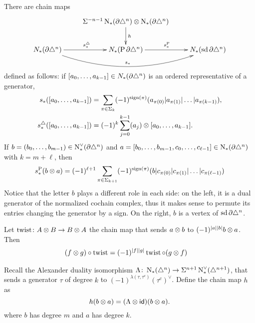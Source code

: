 There are chain maps
\[
\xymatrix{
	&\susp{-n-1}\chains(\partial\simplex^n) \ot  \chains(\partial\simplex^n)\ar[d]^h& \\
	\cadenas(\partial\simplex^n)\ar[r]^{s_*^{\simplex}}\ar@/_2.0pc/[rr]^{s_*} & \cadenas(\Psd \partial\simplex^n)\ar[r]^{s^{\Psd}_*} & \cadenas(\sd\partial\simplex^n)
}
\]
defined as follows: if $[a_0,\ldots,a_{k-1}]\in N_{*}(\partial\triangle^n)$ is an ordered representative of a generator,
\begin{align*}
	s_*([a_0,\ldots,a_{k-1}]) &= \sum_{\pi\in \Sigma_{k}} (-1)^{\operatorname{sign}(\pi)}(a_{\pi(0)}|a_{\pi(1)}|\ldots|a_{\pi(k-1)}),
	\\
	s_*^{\triangle}([a_0,\ldots,a_{k-1}]) &= (-1)^{k}\sum_{j=0}^{k-1} (a_j) \otimes  [a_0,\ldots,a_{k-1}].
\end{align*}
If $b = (b_0,\ldots,b_{m-1})\in \operatorname{N}^\vee_{*}(\partial\triangle^n)$ and $a = [b_0,\ldots,b_{m-1},c_0,\ldots,c_{\ell-1}]\in \operatorname{N}_{*}(\partial\triangle^n)$ with $k = m+\ell$, then
\begin{equation}\label{eq:sP}
	s_*^{\operatorname{P}}(b \otimes  a) = (-1)^{\ell+1}\sum_{\pi\in \Sigma_{k+1}} (-1)^{\operatorname{sign}(\pi)} (b|c_{\pi(0)}|c_{\pi(1)}|\ldots|c_{\pi(\ell-1)})
\end{equation}
Notice that the letter $b$ plays a different role in each side: on the left, it is a dual generator of the normalized cochain complex, thus it makes sense to permute its entries changing the generator by a sign. On the right, $b$ is a vertex of $\operatorname{sd}\partial\triangle^n$.

\begin{remark}
	Let $\operatorname{twist} \colon  A \otimes  B\to B \otimes  A$ the chain map that sends $a \otimes  b$ to $(-1)^{|a||b|}b \otimes  a$. Then
	\begin{align*}
		(f \otimes  g)\circ \operatorname{twist} &= (-1)^{|f||g|}\operatorname{twist} \circ (g \otimes  f)
	\end{align*}
\end{remark}

Recall the Alexander duality isomorphism $\Lambda \colon  \operatorname{N}_{*}(\triangle^n) \to \Sigma^{n+1}\operatorname{N}^\vee_{*}(\triangle^{n+1})$, that sends a generator $\tau$ of degree $k$ to $(-1)^{\lambda(\tau,\tau^c)} (\tau^c)^{\vee}$. Define the chain map $h$ as
\[
h( b \otimes  a) = (\Lambda \otimes  \mathsf{id})(b \otimes  a).
\]
where $b$ has degree $m$ and $a$ has degree $k$.

